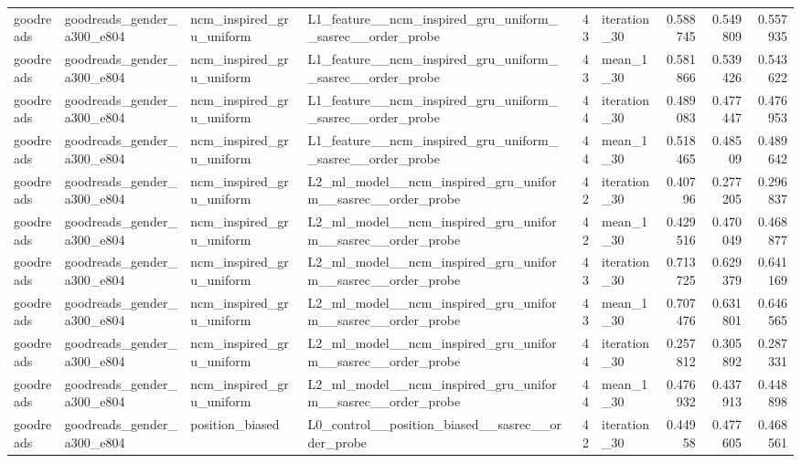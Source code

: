 \begin{table}[htbp!]
\begin{tabular}{llllrlrrr}
goodreads & goodreads\_gender\_a300\_e804 & ncm\_inspired\_gru\_uniform & L1\_feature\_\_ncm\_inspired\_gru\_uniform\_\_sasrec\_\_order\_probe & 43 & iteration\_30 & 0.588745 & 0.549809 & 0.557935 \\
goodreads & goodreads\_gender\_a300\_e804 & ncm\_inspired\_gru\_uniform & L1\_feature\_\_ncm\_inspired\_gru\_uniform\_\_sasrec\_\_order\_probe & 43 & mean\_1\_30 & 0.581866 & 0.539426 & 0.543622 \\
goodreads & goodreads\_gender\_a300\_e804 & ncm\_inspired\_gru\_uniform & L1\_feature\_\_ncm\_inspired\_gru\_uniform\_\_sasrec\_\_order\_probe & 44 & iteration\_30 & 0.489083 & 0.477447 & 0.476953 \\
goodreads & goodreads\_gender\_a300\_e804 & ncm\_inspired\_gru\_uniform & L1\_feature\_\_ncm\_inspired\_gru\_uniform\_\_sasrec\_\_order\_probe & 44 & mean\_1\_30 & 0.518465 & 0.48509 & 0.489642 \\
goodreads & goodreads\_gender\_a300\_e804 & ncm\_inspired\_gru\_uniform & L2\_ml\_model\_\_ncm\_inspired\_gru\_uniform\_\_sasrec\_\_order\_probe & 42 & iteration\_30 & 0.40796 & 0.277205 & 0.296837 \\
goodreads & goodreads\_gender\_a300\_e804 & ncm\_inspired\_gru\_uniform & L2\_ml\_model\_\_ncm\_inspired\_gru\_uniform\_\_sasrec\_\_order\_probe & 42 & mean\_1\_30 & 0.429516 & 0.470049 & 0.468877 \\
goodreads & goodreads\_gender\_a300\_e804 & ncm\_inspired\_gru\_uniform & L2\_ml\_model\_\_ncm\_inspired\_gru\_uniform\_\_sasrec\_\_order\_probe & 43 & iteration\_30 & 0.713725 & 0.629379 & 0.641169 \\
goodreads & goodreads\_gender\_a300\_e804 & ncm\_inspired\_gru\_uniform & L2\_ml\_model\_\_ncm\_inspired\_gru\_uniform\_\_sasrec\_\_order\_probe & 43 & mean\_1\_30 & 0.707476 & 0.631801 & 0.646565 \\
goodreads & goodreads\_gender\_a300\_e804 & ncm\_inspired\_gru\_uniform & L2\_ml\_model\_\_ncm\_inspired\_gru\_uniform\_\_sasrec\_\_order\_probe & 44 & iteration\_30 & 0.257812 & 0.305892 & 0.287331 \\
goodreads & goodreads\_gender\_a300\_e804 & ncm\_inspired\_gru\_uniform & L2\_ml\_model\_\_ncm\_inspired\_gru\_uniform\_\_sasrec\_\_order\_probe & 44 & mean\_1\_30 & 0.476932 & 0.437913 & 0.448898 \\
goodreads & goodreads\_gender\_a300\_e804 & position\_biased & L0\_control\_\_position\_biased\_\_sasrec\_\_order\_probe & 42 & iteration\_30 & 0.44958 & 0.477605 & 0.468561 \\

\end{tabular}
\end{table}
